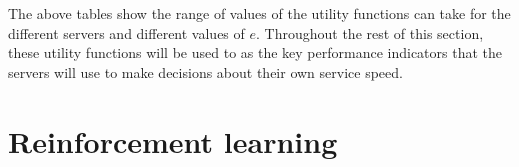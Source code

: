 The above tables show the range of values of the utility functions can take
for the different servers and different values of \(e\).
Throughout the rest of this section, these utility functions will be used to
as the key performance indicators that the servers will use to make decisions
about their own service speed.





\section{Reinforcement learning}
